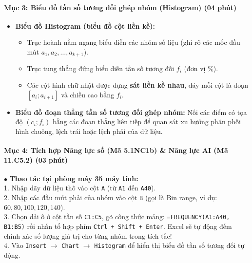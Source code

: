 \documentclass[12pt, a4paper]{article}
\begin{document}
\paragraph{Mục 3: Biểu đồ tần số tương đối ghép nhóm (Histogram) (04 phút)}
\begin{itemize}
    \item \textbf{Biểu đồ Histogram (biểu đồ cột liền kề):}
    \begin{itemize}
        \item Trục hoành nằm ngang biểu diễn các nhóm số liệu (ghi rõ các mốc đầu mút $a_1, a_2, \dots, a_{k+1}$).
        \item Trục tung thẳng đứng biểu diễn tần số tương đối $f_i$ (đơn vị $\%$).
        \item Các cột hình chữ nhật được dựng \textbf{sát liền kề nhau}, đáy mỗi cột là đoạn $[a_i; a_{i+1}]$ và chiều cao bằng $f_i$.
    \end{itemize}
    \item \textbf{Biểu đồ đoạn thẳng tần số tương đối ghép nhóm:} Nối các điểm có tọa độ $(c_i; f_i)$ bằng các đoạn thẳng liên tiếp để quan sát xu hướng phân phối hình chuông, lệch trái hoặc lệch phải của dữ liệu.
\end{itemize}

\paragraph{Mục 4: Tích hợp Năng lực số (Mã 5.1NC1b) \& Năng lực AI (Mã 11.C5.2) (03 phút)}

\begin{pedabox}
    $\bullet$ \textbf{Thao tác tại phòng máy 35 máy tính:}\\
    1. Nhập dãy dữ liệu thô vào cột \texttt{A} (từ \texttt{A1} đến \texttt{A40}).\\
    2. Nhập các đầu mút phải của nhóm vào cột \texttt{B} (gọi là Bin range, ví dụ: $60, 80, 100, 120, 140$).\\
    3. Chọn dải ô ở cột tần số \texttt{C1:C5}, gõ công thức mảng: \texttt{=FREQUENCY(A1:A40, B1:B5)} rồi nhấn tổ hợp phím \texttt{Ctrl + Shift + Enter}. Excel sẽ tự động đếm chính xác số lượng giá trị cho từng nhóm trong tích tắc!\\
    4. Vào \texttt{Insert} $\to$ \texttt{Chart} $\to$ \texttt{Histogram} để hiển thị biểu đồ tần số tương đối tự động.
\end{pedabox}
\end{document}
